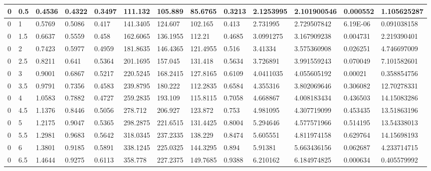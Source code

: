 \begin{longtable}{|l|l|l|l|l|l|l|l|l|l|l|l|l|}
0     & 0.5   & 0.4536  & 0.4322  & 0.3497  & 111.132  & 105.889  & 85.6765  & 0.3213   & 2.1253995   & 2.101900546    & 0.000552                 & 1.105625287 \\ \hline
0     & 1     & 0.5769  & 0.5086  & 0.417   & 141.3405 & 124.607  & 102.165  & 0.413    & 2.731995    & 2.729507842    & 6.19E-06                 & 0.091038158 \\ \hline
0     & 1.5   & 0.6637  & 0.5559  & 0.458   & 162.6065 & 136.1955 & 112.21   & 0.4685   & 3.0991275   & 3.167909238    & 0.004731                 & 2.219390401 \\ \hline
0     & 2     & 0.7423  & 0.5977  & 0.4959  & 181.8635 & 146.4365 & 121.4955 & 0.516    & 3.41334     & 3.575360908    & 0.026251                 & 4.746697009 \\ \hline
0     & 2.5   & 0.8211  & 0.641   & 0.5364  & 201.1695 & 157.045  & 131.418  & 0.5634   & 3.726891    & 3.991559243    & 0.070049                 & 7.101582601 \\ \hline
0     & 3     & 0.9001  & 0.6867  & 0.5217  & 220.5245 & 168.2415 & 127.8165 & 0.6109   & 4.0411035   & 4.055605192    & 0.00021                  & 0.358854756 \\ \hline
0     & 3.5   & 0.9791  & 0.7356  & 0.4583  & 239.8795 & 180.222  & 112.2835 & 0.6584   & 4.355316    & 3.802069646    & 0.306082                 & 12.70278331 \\ \hline
0     & 4     & 1.0583  & 0.7882  & 0.4727  & 259.2835 & 193.109  & 115.8115 & 0.7058   & 4.668867    & 4.008183434    & 0.436503                 & 14.15083286 \\ \hline
0     & 4.5   & 1.1376  & 0.8446  & 0.5056  & 278.712  & 206.927  & 123.872  & 0.753    & 4.981095    & 4.307719099    & 0.453435                 & 13.51863196 \\ \hline
0     & 5     & 1.2175  & 0.9047  & 0.5365  & 298.2875 & 221.6515 & 131.4425 & 0.8004   & 5.294646    & 4.577571966    & 0.514195                 & 13.54338013 \\ \hline
0     & 5.5   & 1.2981  & 0.9683  & 0.5642  & 318.0345 & 237.2335 & 138.229  & 0.8474   & 5.605551    & 4.811974158    & 0.629764                 & 14.15698193 \\ \hline
0     & 6     & 1.3801  & 0.9185  & 0.5891  & 338.1245 & 225.0325 & 144.3295 & 0.894    & 5.91381     & 5.663436156    & 0.062687                 & 4.233714715 \\ \hline
0     & 6.5   & 1.4644  & 0.9275  & 0.6113  & 358.778  & 227.2375 & 149.7685 & 0.9388   & 6.210162    & 6.184974825    & 0.000634                 & 0.405579992 \\ \hline

\end{longtable}

